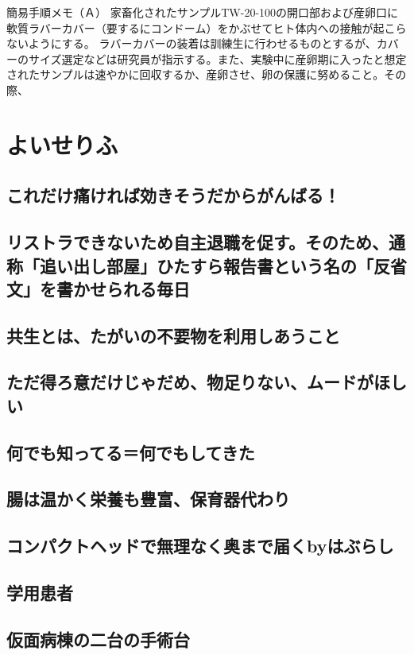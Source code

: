 簡易手順メモ（Ａ）
家畜化されたサンプルTW-20-100の開口部および産卵口に軟質ラバーカバー（要するにコンドーム）をかぶせてヒト体内への接触が起こらないようにする。
ラバーカバーの装着は訓練生に行わせるものとするが、カバーのサイズ選定などは研究員が指示する。また、実験中に産卵期に入ったと想定されたサンプルは速やかに回収するか、産卵させ、卵の保護に努めること。その際、



\chapter{よいせりふ}
\section{これだけ痛ければ効きそうだからがんばる！}
\section{リストラできないため自主退職を促す。そのため、通称「追い出し部屋」ひたすら報告書という名の「反省文」を書かせられる毎日}
\section{共生とは、たがいの不要物を利用しあうこと}
\section{ただ得ろ意だけじゃだめ、物足りない、ムードがほしい}
\section{何でも知ってる＝何でもしてきた}
\section{腸は温かく栄養も豊富、保育器代わり}

\section{コンパクトヘッドで無理なく奥まで届くbyはぶらし}

\section{学用患者}

\section{仮面病棟の二台の手術台}

